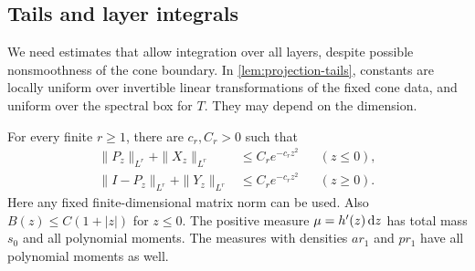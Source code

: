 \subsection{Tails and layer integrals}
We need estimates that allow integration over all layers, despite possible nonsmoothness of the cone boundary. In \cref{lem:projection-tails}, constants are locally uniform over invertible linear transformations of the fixed cone data, and uniform over the spectral box for $T$. They may depend on the dimension.

\begin{lemma}\label{lem:projection-tails}
For every finite $r\ge1$, there are $c_r,C_r>0$ such that
\[
\begin{aligned}
\|P_z\|_{L^r}+\|X_z\|_{L^r}&\le C_re^{-c_rz^2}&& (z\le0),\\
\|I-P_z\|_{L^r}+\|Y_z\|_{L^r}&\le C_re^{-c_rz^2}&& (z\ge0).
\end{aligned}
\]
Here any fixed finite-dimensional matrix norm can be used. Also $B(z)\le C(1+|z|)$ for $z\le0$. The positive measure $\mu=h'(z)\,\mathrm{d} z$ has total mass $s_0$ and all polynomial moments. The measures with densities $ar_1$ and $pr_1$ have all polynomial moments as well.
\end{lemma}
